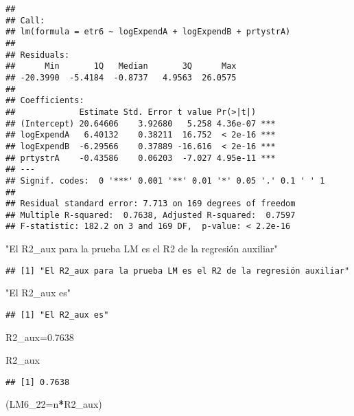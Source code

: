 \documentclass[
]{article}
\newenvironment{Shaded}{\begin{snugshade}}{\end{snugshade}}
\newcommand{\DataTypeTok}[1]{\textcolor[rgb]{0.13,0.29,0.53}{#1}}
\newcommand{\FloatTok}[1]{\textcolor[rgb]{0.00,0.00,0.81}{#1}}
\newcommand{\NormalTok}[1]{#1}
\newcommand{\OperatorTok}[1]{\textcolor[rgb]{0.81,0.36,0.00}{\textbf{#1}}}
\newcommand{\StringTok}[1]{\textcolor[rgb]{0.31,0.60,0.02}{#1}}
\begin{document}
\begin{verbatim}
## 
## Call:
## lm(formula = etr6 ~ logExpendA + logExpendB + prtystrA)
## 
## Residuals:
##      Min       1Q   Median       3Q      Max 
## -20.3990  -5.4184  -0.8737   4.9563  26.0575 
## 
## Coefficients:
##             Estimate Std. Error t value Pr(>|t|)    
## (Intercept) 20.64606    3.92680   5.258 4.36e-07 ***
## logExpendA   6.40132    0.38211  16.752  < 2e-16 ***
## logExpendB  -6.29566    0.37889 -16.616  < 2e-16 ***
## prtystrA    -0.43586    0.06203  -7.027 4.95e-11 ***
## ---
## Signif. codes:  0 '***' 0.001 '**' 0.01 '*' 0.05 '.' 0.1 ' ' 1
## 
## Residual standard error: 7.713 on 169 degrees of freedom
## Multiple R-squared:  0.7638, Adjusted R-squared:  0.7597 
## F-statistic: 182.2 on 3 and 169 DF,  p-value: < 2.2e-16
\end{verbatim}

\begin{Shaded}
\begin{Highlighting}[]
\StringTok{"El R2_aux para la prueba LM es el R2 de la regresión auxiliar"}
\end{Highlighting}
\end{Shaded}

\begin{verbatim}
## [1] "El R2_aux para la prueba LM es el R2 de la regresión auxiliar"
\end{verbatim}

\begin{Shaded}
\begin{Highlighting}[]
\StringTok{"El R2_aux es"}
\end{Highlighting}
\end{Shaded}

\begin{verbatim}
## [1] "El R2_aux es"
\end{verbatim}

\begin{Shaded}
\begin{Highlighting}[]
\NormalTok{R2_aux=}\FloatTok{0.7638}

\NormalTok{R2_aux}
\end{Highlighting}
\end{Shaded}

\begin{verbatim}
## [1] 0.7638
\end{verbatim}

\begin{Shaded}
\begin{Highlighting}[]
\NormalTok{(}\DataTypeTok{LM6_22=}\NormalTok{n}\OperatorTok{*}\NormalTok{R2_aux)}
\end{Highlighting}
\end{Shaded}
\end{document}
